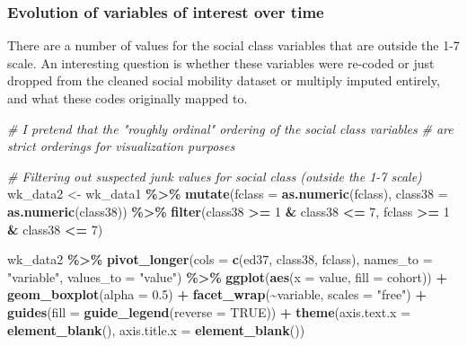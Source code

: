 \documentclass[
]{article}
\newenvironment{Shaded}{\begin{snugshade}}{\end{snugshade}}
\newcommand{\AttributeTok}[1]{\textcolor[rgb]{0.13,0.29,0.53}{#1}}
\newcommand{\CommentTok}[1]{\textcolor[rgb]{0.56,0.35,0.01}{\textit{#1}}}
\newcommand{\ConstantTok}[1]{\textcolor[rgb]{0.56,0.35,0.01}{#1}}
\newcommand{\DecValTok}[1]{\textcolor[rgb]{0.00,0.00,0.81}{#1}}
\newcommand{\FloatTok}[1]{\textcolor[rgb]{0.00,0.00,0.81}{#1}}
\newcommand{\FunctionTok}[1]{\textcolor[rgb]{0.13,0.29,0.53}{\textbf{#1}}}
\newcommand{\NormalTok}[1]{#1}
\newcommand{\OtherTok}[1]{\textcolor[rgb]{0.56,0.35,0.01}{#1}}
\newcommand{\SpecialCharTok}[1]{\textcolor[rgb]{0.81,0.36,0.00}{\textbf{#1}}}
\newcommand{\StringTok}[1]{\textcolor[rgb]{0.31,0.60,0.02}{#1}}
\begin{document}
\subsubsection{Evolution of variables of interest over
time}\label{evolution-of-variables-of-interest-over-time}

There are a number of values for the social class variables that are
outside the 1-7 scale. An interesting question is whether these
variables were re-coded or just dropped from the cleaned social mobility
dataset or multiply imputed entirely, and what these codes originally
mapped to.

\begin{Shaded}
\begin{Highlighting}[]
\CommentTok{\# I pretend that the "roughly ordinal" ordering of the social class variables}
\CommentTok{\# are strict orderings for visualization purposes}

\CommentTok{\# Filtering out suspected junk values for social class (outside the 1{-}7 scale)}
\NormalTok{wk\_data2 }\OtherTok{\textless{}{-}}\NormalTok{ wk\_data1 }\SpecialCharTok{\%\textgreater{}\%}
  \FunctionTok{mutate}\NormalTok{(}\AttributeTok{fclass =} \FunctionTok{as.numeric}\NormalTok{(fclass), }
         \AttributeTok{class38 =} \FunctionTok{as.numeric}\NormalTok{(class38)) }\SpecialCharTok{\%\textgreater{}\%}
  \FunctionTok{filter}\NormalTok{(class38 }\SpecialCharTok{\textgreater{}=} \DecValTok{1} \SpecialCharTok{\&}\NormalTok{ class38 }\SpecialCharTok{\textless{}=} \DecValTok{7}\NormalTok{,}
\NormalTok{         fclass }\SpecialCharTok{\textgreater{}=} \DecValTok{1} \SpecialCharTok{\&}\NormalTok{ class38 }\SpecialCharTok{\textless{}=} \DecValTok{7}\NormalTok{) }

\NormalTok{wk\_data2 }\SpecialCharTok{\%\textgreater{}\%}
  \FunctionTok{pivot\_longer}\NormalTok{(}\AttributeTok{cols =} \FunctionTok{c}\NormalTok{(ed37, class38, fclass), }\AttributeTok{names\_to =} \StringTok{"variable"}\NormalTok{, }\AttributeTok{values\_to =} \StringTok{"value"}\NormalTok{) }\SpecialCharTok{\%\textgreater{}\%}
  \FunctionTok{ggplot}\NormalTok{(}\FunctionTok{aes}\NormalTok{(}\AttributeTok{x =}\NormalTok{ value, }\AttributeTok{fill =}\NormalTok{ cohort)) }\SpecialCharTok{+}
  \FunctionTok{geom\_boxplot}\NormalTok{(}\AttributeTok{alpha =} \FloatTok{0.5}\NormalTok{) }\SpecialCharTok{+} 
  \FunctionTok{facet\_wrap}\NormalTok{(}\SpecialCharTok{\textasciitilde{}}\NormalTok{variable, }\AttributeTok{scales =} \StringTok{"free"}\NormalTok{) }\SpecialCharTok{+} 
  \FunctionTok{guides}\NormalTok{(}\AttributeTok{fill =} \FunctionTok{guide\_legend}\NormalTok{(}\AttributeTok{reverse =} \ConstantTok{TRUE}\NormalTok{)) }\SpecialCharTok{+} 
  \FunctionTok{theme}\NormalTok{(}\AttributeTok{axis.text.x =} \FunctionTok{element\_blank}\NormalTok{(),}
        \AttributeTok{axis.title.x =} \FunctionTok{element\_blank}\NormalTok{())}
\end{Highlighting}
\end{Shaded}
\end{document}
